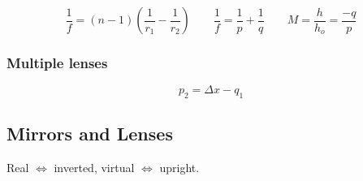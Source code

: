 
\[
	\frac{1}{f} = (n-1)(\frac{1}{r_1} - \frac{1}{r_2}) \qquad
	\frac{1}{f} = \frac{1}{p} + \frac{1}{q} \qquad
	M = \frac{h}{h_o} = \frac{-q}{p}
\]

\subsubsection{Multiple lenses}

\[
	p_2 = \Delta x - q_1
\]

\subsection{Mirrors and Lenses}


Real $\iff$ inverted, virtual $\iff$ upright.

